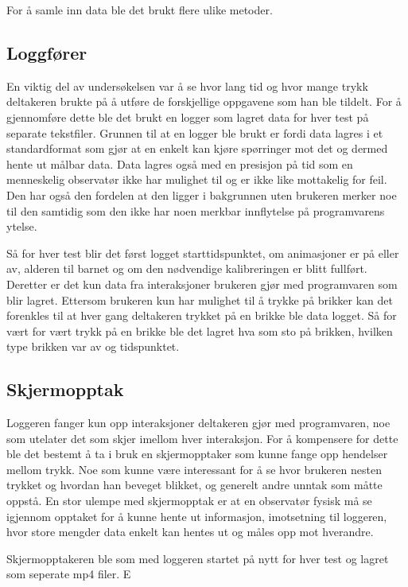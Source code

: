 For å samle inn data ble det brukt flere ulike metoder. 


\subsection{Loggfører}
En viktig del av undersøkelsen var å se hvor lang tid og hvor mange trykk deltakeren brukte på å utføre de forskjellige oppgavene som han ble tildelt. For å gjennomføre dette ble det brukt en logger som lagret data for hver test på separate tekstfiler. Grunnen til at en logger ble brukt er fordi data lagres i et standardformat som gjør at en enkelt kan kjøre spørringer mot det og dermed hente ut målbar data. Data lagres også med en presisjon på tid som en menneskelig observatør ikke har mulighet til og er ikke like mottakelig for feil. Den har også den fordelen at den ligger i bakgrunnen uten brukeren merker noe til den samtidig som den ikke har noen merkbar innflytelse på programvarens ytelse.

Så for hver test blir det først logget starttidspunktet, om animasjoner er på eller av, alderen til barnet og om den nødvendige kalibreringen er blitt fullført. Deretter er det kun data fra interaksjoner brukeren gjør med programvaren som blir lagret. Ettersom brukeren kun har mulighet til å trykke på brikker kan det forenkles til at hver gang deltakeren trykket på en brikke ble data logget. Så for vært for vært trykk på en brikke ble det lagret hva som sto på brikken, hvilken type brikken var av og tidspunktet.


\subsection{Skjermopptak}

Loggeren fanger kun opp interaksjoner deltakeren gjør med programvaren, noe som utelater det som skjer imellom hver interaksjon. For å kompensere for dette ble det bestemt å ta i bruk en skjermopptaker som kunne fange opp hendelser mellom trykk. Noe som kunne være interessant for å se hvor brukeren nesten trykket og hvordan han beveget blikket, og generelt andre unntak som måtte oppstå. En stor ulempe med skjermopptak er at en observatør fysisk må se igjennom opptaket for å kunne hente ut informasjon, imotsetning til loggeren, hvor store mengder data enkelt kan hentes ut og måles opp mot hverandre.

Skjermopptakeren ble som med loggeren startet på nytt for hver test og lagret som seperate mp4 filer. E


